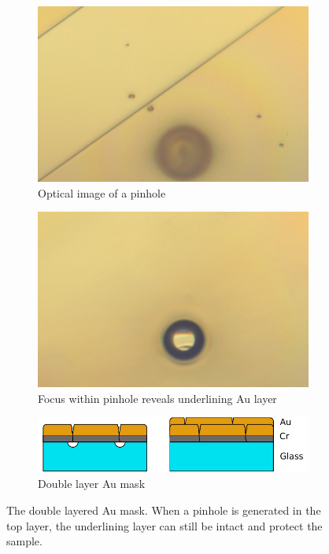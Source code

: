 \documentclass[final]{jyflluk}
\begin{document}
\begin{figure}[!h]
    \centering    
    \begin{subfigure}{0.49\textwidth}
        \centering
        \includegraphics[width=\linewidth]{optical/pinhole00.png} 
        \caption{Optical image of a pinhole} \label{fig:pinholee}
    \end{subfigure}
    \hfill
    \begin{subfigure}{0.50\textwidth}
        \centering
        \includegraphics[width=\linewidth]{optical/pinhole01.png} 
        \caption{Focus within pinhole reveals underlining Au layer} \label{fig:pinholeee}
    \end{subfigure}
    
    \vspace{0.8cm}
    \begin{subfigure}{\textwidth}
    \centering
        \includegraphics[width=\linewidth]{images/pinhol.pdf} 
        \caption{Double layer Au mask} \label{fig:mask_idea}
    \end{subfigure}
    \caption{The double layered Au mask. When a pinhole is generated in the top layer, the underlining layer can still be intact and protect the sample.} \label{fig:multilayer_mask}
\end{figure}
\end{document}
